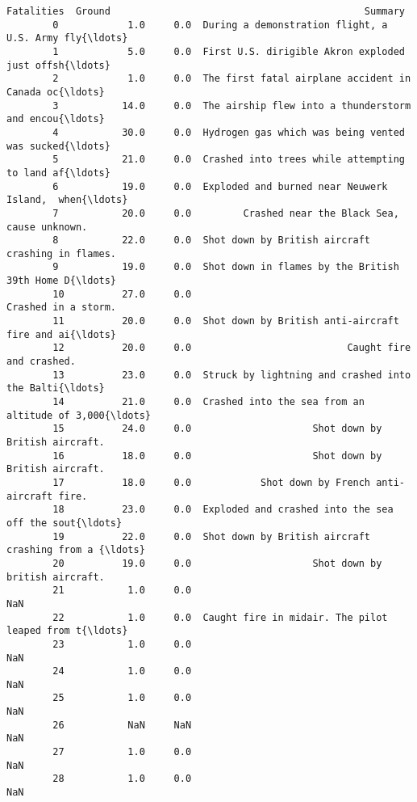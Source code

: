 \documentclass[11pt]{article}
\begin{document}
\begin{Verbatim}[commandchars=\\\{\}]
              Fatalities  Ground                                            Summary  
        0            1.0     0.0  During a demonstration flight, a U.S. Army fly{\ldots}  
        1            5.0     0.0  First U.S. dirigible Akron exploded just offsh{\ldots}  
        2            1.0     0.0  The first fatal airplane accident in Canada oc{\ldots}  
        3           14.0     0.0  The airship flew into a thunderstorm and encou{\ldots}  
        4           30.0     0.0  Hydrogen gas which was being vented was sucked{\ldots}  
        5           21.0     0.0  Crashed into trees while attempting to land af{\ldots}  
        6           19.0     0.0  Exploded and burned near Neuwerk Island,  when{\ldots}  
        7           20.0     0.0         Crashed near the Black Sea, cause unknown.  
        8           22.0     0.0  Shot down by British aircraft crashing in flames.  
        9           19.0     0.0  Shot down in flames by the British 39th Home D{\ldots}  
        10          27.0     0.0                                Crashed in a storm.  
        11          20.0     0.0  Shot down by British anti-aircraft fire and ai{\ldots}  
        12          20.0     0.0                           Caught fire and crashed.  
        13          23.0     0.0  Struck by lightning and crashed into the Balti{\ldots}  
        14          21.0     0.0  Crashed into the sea from an altitude of 3,000{\ldots}  
        15          24.0     0.0                     Shot down by British aircraft.  
        16          18.0     0.0                     Shot down by British aircraft.  
        17          18.0     0.0            Shot down by French anti-aircraft fire.  
        18          23.0     0.0  Exploded and crashed into the sea off the sout{\ldots}  
        19          22.0     0.0  Shot down by British aircraft crashing from a {\ldots}  
        20          19.0     0.0                     Shot down by british aircraft.  
        21           1.0     0.0                                                NaN  
        22           1.0     0.0  Caught fire in midair. The pilot leaped from t{\ldots}  
        23           1.0     0.0                                                NaN  
        24           1.0     0.0                                                NaN  
        25           1.0     0.0                                                NaN  
        26           NaN     NaN                                                NaN  
        27           1.0     0.0                                                NaN  
        28           1.0     0.0                                                NaN  

\end{Verbatim}
\end{document}
